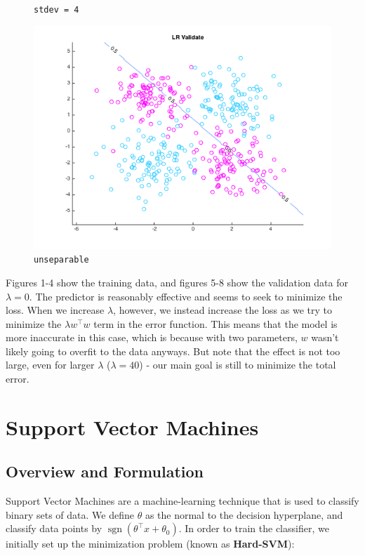 \documentclass[10pt,letterpaper]{article}
\DeclareMathOperator{\sign}{sgn}
\begin{document}
\begin{figure}[!htb]
  \caption{\texttt{stdev = 4}}\label{fig:gradDifS}
\endminipage\hfill
{}
  \includegraphics[width=\linewidth]{figures/sdnv20.png}
  \caption{\texttt{unseparable}}\label{fig:gradDifS}
\endminipage

\end{figure}

Figures 1-4 show the training data, and figures 5-8 show the validation data for $\lambda = 0$. The predictor is reasonably effective and seems to seek to minimize the loss. When we increase $\lambda$, however, we instead increase the loss as we try to minimize the $\lambda w^\intercal w$ term in the error function. This means that the model is more inaccurate in this case, which is because with two parameters, $w$ wasn't likely going to overfit to the data anyways. But note that the effect is not too large, even for larger $\lambda$ ($\lambda = 40$) - our main goal is still to minimize the total error.




\section{Support Vector Machines}
\subsection{Overview and Formulation}
Support Vector Machines are a machine-learning technique that is used to classify binary sets of data. We define $\theta$ as the normal to the decision hyperplane, and classify data points by $\sign (\theta^\intercal x + \theta_0)$. In order to train the classifier, we initially set up the minimization problem (known as \textbf{Hard-SVM}):
\end{document}
